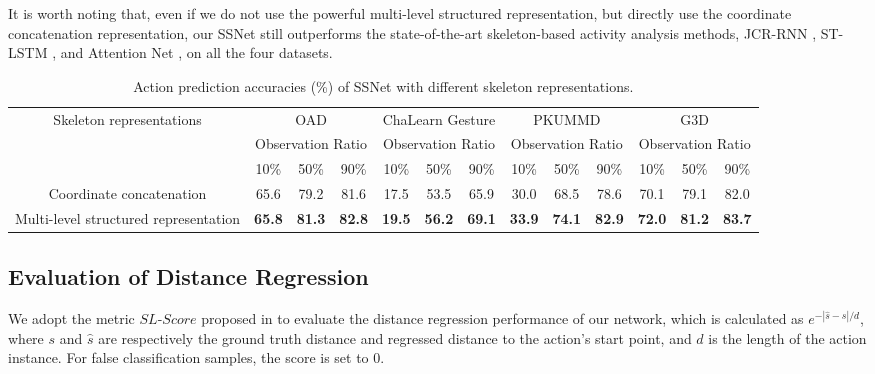 \documentclass[10pt,twocolumn,letterpaper]{article}
\begin{document}
It is worth noting that,
even if we do not use the powerful multi-level structured representation, but directly use the coordinate concatenation representation,
our SSNet still outperforms the state-of-the-art skeleton-based activity analysis methods,
JCR-RNN \cite{li2016online}, ST-LSTM \cite{liu2017PAMI}, and Attention Net \cite{liu2017global}, on all the four datasets.



\begin{table*}[tbp]
\caption{Action prediction accuracies (\%) of SSNet with different skeleton representations.}
\label{table:SKLrepresent}
\centering
\small
\begin{tabular}{ccccccccccccc}
\toprule
\multirow{3}{*}{Skeleton representations} & \multicolumn{3}{c}{OAD}                & \multicolumn{3}{c}{ChaLearn Gesture}    & \multicolumn{3}{c}{PKUMMD}             & \multicolumn{3}{c}{G3D} \\
\cmidrule(r){2-13}
                                          & \multicolumn{3}{c}{Observation Ratio}  & \multicolumn{3}{c}{Observation Ratio}   & \multicolumn{3}{c}{Observation Ratio}  & \multicolumn{3}{c}{Observation Ratio} \\
\cmidrule(r){2-13}

                                          &    10\% &    50\%    & 90\%            &    10\% &    50\%    & 90\%             &    10\% &    50\%    & 90\%             &    10\% &    50\%    & 90\%      \\
\midrule
Coordinate concatenation                  &  65.6   &    79.2    & 81.6            &  17.5   &   53.5     & 65.9             &   30.0  &    68.5    & 78.6             &  70.1   & 79.1       & 82.0      \\
Multi-level structured representation &\textbf{65.8}&\textbf{81.3}&\textbf{82.8} &\textbf{19.5}&\textbf{56.2}&\textbf{69.1} &\textbf{33.9}&\textbf{74.1}&\textbf{82.9} &\textbf{72.0}&\textbf{81.2}&\textbf{83.7} \\
\bottomrule
\end{tabular}
\end{table*}

\subsection{Evaluation of Distance Regression}
\label{sec:experiment:distRegression}


We adopt the metric $SL$-$Score$ proposed in \cite{li2016online} to evaluate the distance regression performance of our network,
which is calculated as $e^{-|\hat{s} - s|/d}$,
where $s$ and $\hat{s}$ are respectively the ground truth distance and regressed distance to the action's start point,
and $d$ is the length of the action instance.
For false classification samples, the score is set to 0.
\end{document}
